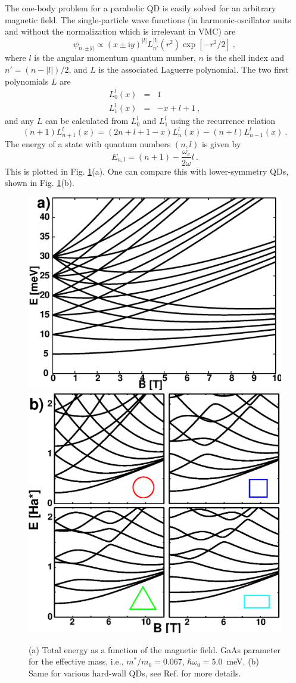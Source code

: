 \documentclass{article}
\begin{document}
The one-body problem for a parabolic QD is easily solved for an arbitrary
magnetic field\cite{Fock}. The single-particle wave functions (in
harmonic-oscillator units and without the normalization which is irrelevant in
VMC) are
\begin{equation}
\psi_{n, \pm |l|}\propto (x\pm{\mathrm i}y)^{|l|} L_{n'}^{|l|}(r^2) 
\exp\left[-{ r^2}/{2}\right] \ ,
\label{fd}
\end{equation}
where $l$ is the angular momentum quantum number, $n$ is the shell index and
$n'=(n-|l|)/2$, and $L$ is the associated Laguerre polynomial. The two first
polynomials $L$ are
\begin{eqnarray}
L_0^l(x)&=&1\\
L_1^l(x)&=&-x+l+1\ ,
\end{eqnarray}
and any $L$ can be calculated from $L_0^l$ and $L_1^l$ using the recurrence
relation
\begin{equation}
(n+1)L_{n+1}^l(x)=(2n+l+1-x)L_{n}^{l}(x)-(n+l)L_{n-1}^{l}(x) \ .
\label{recurrence}
\end{equation}
The energy of a state with quantum numbers $(n,l)$ is given by
\begin{equation}
E_{n,l} = (n+1) - \frac{\omega_c}{2 \omega}l \ .
\end{equation}
This is plotted in Fig. \ref{QD_states_5meV}(a). One can compare this with
lower-symmetry QDs, shown in Fig. \ref{QD_states_5meV}(b)\cite{rectaB}.
%
\begin{figure}[hbt]
  \includegraphics[width=0.55\columnwidth]{QD_the1}
  \includegraphics[width=0.45\columnwidth]{New_nonint}
\caption{(a) Total energy as a function of the magnetic field.  GaAs
  parameter for the effective mass, i.e., $m^*/m_0=0.067$,
  $\hbar\omega_0=5.0$~meV. (b) Same for various hard-wall QDs, see
  Ref.   for more details.}
\label{QD_states_5meV}
\end{figure}
\end{document}
